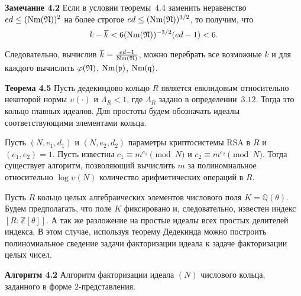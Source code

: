 \documentclass[_00_autoref.tex]{subfiles}
\begin{document}
\textbf{Замечание 4.2}
    Если в условии теоремы~$4.4$ заменить неравенство $ed \le (\textrm{Nm}(\mathfrak{N}))^2$ на более строгое $e d \le (\textrm{Nm}(\mathfrak{N}))^{3/2}$, то получим, что
    \begin{equation*}
        k - \overline{k} < 6(\textrm{Nm}(\mathfrak{N}))^{-3/2}(ed-1) < 6.
    \end{equation*}
    
    Следовательно, вычислив $\overline{k} = \frac{ed-1}{\textrm{Nm}(\mathfrak{N})}$, можно перебрать все возможные $k$ и для каждого вычислить $\varphi(\mathfrak{N})$, $\textrm{Nm}(\mathfrak{p})$, $\textrm{Nm}(\mathfrak{q})$.

\textbf{Теорема 4.5}
    Пусть дедекиндово кольцо $R$ является евклидовым относительно некоторой нормы $\upsilon(\cdot)$ и $\Lambda_{R} < 1$, где $\Lambda_{R}$ задано в определении~$3.12$.
    Тогда это кольцо главных идеалов.
    Для простоты будем обозначать идеалы соответствующими элементами кольца.

    Пусть $(N, e_1, d_1)$ и $(N, e_2, d_2)$ параметры криптосистемы RSA в $R$ и $(e_1, e_2) = 1$.
    Пусть известны $c_1 \equiv m^{e_1} \pmod{N}$ и $c_2 \equiv m^{e_2} \pmod{N}$.
    Тогда существует алгоритм, позволяющий вычислить $m$ за полиномиальное относительно $\log \upsilon(N)$ количество арифметических операций в $R$.


Пусть $R$ кольцо целых алгебраических элементов числового поля $K = \mathbb{Q}(\theta)$.
Будем предполагать, что поле $K$ фиксировано и, следовательно, известен индекс $[R: \mathbb{Z}[\theta]]$.
А так же разложение на простые идеалы всех простых делителей индекса.
В этом случае, используя теорему Дедекинда можно построить полиномиальное сведение задачи факторизации идеала к задаче факторизации целых чисел.

\textbf{Алгоритм 4.2}
    Алгоритм факторизации идеала $(N)$ числового кольца, заданного в форме $2$-представления.
\end{document}

